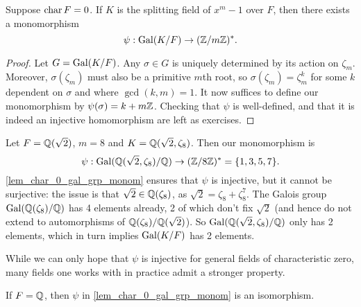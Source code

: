 \begin{lemma}
\label{lem_char_0_gal_grp_monom}
    Suppose $\operatorname{char}{{F}} = 0$. If $K$ is the splitting field of $x^m - 1$ over $F$, then there exists a monomorphism
    \[
        \psi : \operatorname{Gal}(K/F) \to (\mathbb{{Z}}/{{m}}\mathbb{{Z}})^*.
    \]
\end{lemma}

\begin{proof}
    Let $G = \operatorname{Gal}(K/F)$. Any $\sigma \in G$ is uniquely determined by its action on $\zeta_m$. Moreover, $\sigma(\zeta_m)$ must also be a primitive $m$th root, so $\sigma(\zeta_m) = \zeta_m^{k}$ for some $k$ dependent on $\sigma$ and where $\gcd(k, m) = 1$. It now suffices to define our monomorphism by $\psi(\sigma) = k + m\mathbb{{Z}}$. Checking that $\psi$ is well-defined, and that it is indeed an injective homomorphism are left as exercises.
\end{proof}

\begin{example}
    Let $F = \mathbb{{Q}}(\sqrt{2})$, $m = 8$ and $K = \mathbb{{Q}}(\sqrt{2}, \zeta_8)$. Then our monomorphism is
    \[
        \psi: \operatorname{Gal}(\mathbb{{Q}}(\sqrt{2}, \zeta_8)/\mathbb{{Q}}) \to (\mathbb{{Z}}/{{8}}\mathbb{{Z}})^* = \{1, 3, 5, 7\}.
    \]
    \cref{lem_char_0_gal_grp_monom} ensures that $\psi$ is injective, but it cannot be surjective: the issue is that $\sqrt{2} \in \mathbb{{Q}}(\zeta_8)$, as $\sqrt{2} = \zeta_8 + \zeta_8^7$. The Galois group $\operatorname{Gal}(\mathbb{{Q}}(\zeta_8)/\mathbb{{Q}})$ has 4 elements already, 2 of which don't fix $\sqrt{2}$ (and hence do not extend to automorphisms of $\mathbb{{Q}}(\zeta_8)/\mathbb{{Q}}(\sqrt{2})$). So $\operatorname{Gal}(\mathbb{{Q}}(\sqrt{2}, \zeta_8)/\mathbb{{Q}})$ only has 2 elements, which in turn implies $\operatorname{Gal}(K/F)$ has 2 elements.
\end{example}

While we can only hope that $\psi$ is injective for general fields of characteristic zero, many fields one works with in practice admit a stronger property.

\begin{theorem}
\label{thm_gal_grp_isom_over_q}
    If $F = \mathbb{{Q}}$, then $\psi$ in \cref{lem_char_0_gal_grp_monom} is an isomorphism.
\end{theorem}

